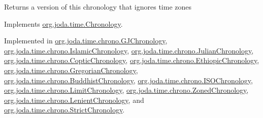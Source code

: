 \begin{DoxyReturn}{Returns}
a version of this chronology that ignores time zones 
\end{DoxyReturn}


Implements \hyperlink{classorg_1_1joda_1_1time_1_1_chronology_ab766a75c1e8d6daf119dc313088d9d53}{org.\-joda.\-time.\-Chronology}.



Implemented in \hyperlink{classorg_1_1joda_1_1time_1_1chrono_1_1_g_j_chronology_a76716c09d1606944ca70c1caeb07d7d9}{org.\-joda.\-time.\-chrono.\-G\-J\-Chronology}, \hyperlink{classorg_1_1joda_1_1time_1_1chrono_1_1_islamic_chronology_ac6349212d65c919a98bf09f4cb2007f0}{org.\-joda.\-time.\-chrono.\-Islamic\-Chronology}, \hyperlink{classorg_1_1joda_1_1time_1_1chrono_1_1_julian_chronology_a30554cff54dffeed275a4c6c85a652dd}{org.\-joda.\-time.\-chrono.\-Julian\-Chronology}, \hyperlink{classorg_1_1joda_1_1time_1_1chrono_1_1_coptic_chronology_a7b23ee9b458cd5a20c801eb48f7d8b1e}{org.\-joda.\-time.\-chrono.\-Coptic\-Chronology}, \hyperlink{classorg_1_1joda_1_1time_1_1chrono_1_1_ethiopic_chronology_aac9b3588161aa267d650cd74c27cebbb}{org.\-joda.\-time.\-chrono.\-Ethiopic\-Chronology}, \hyperlink{classorg_1_1joda_1_1time_1_1chrono_1_1_gregorian_chronology_a2efd6649353e4b99d85b4c091dcf3915}{org.\-joda.\-time.\-chrono.\-Gregorian\-Chronology}, \hyperlink{classorg_1_1joda_1_1time_1_1chrono_1_1_buddhist_chronology_a58019cde9420f095239425713f9497c4}{org.\-joda.\-time.\-chrono.\-Buddhist\-Chronology}, \hyperlink{classorg_1_1joda_1_1time_1_1chrono_1_1_i_s_o_chronology_a0688f24aa875e752c6140404d36c9423}{org.\-joda.\-time.\-chrono.\-I\-S\-O\-Chronology}, \hyperlink{classorg_1_1joda_1_1time_1_1chrono_1_1_limit_chronology_a00f3af557e93d287883f7816097c9aff}{org.\-joda.\-time.\-chrono.\-Limit\-Chronology}, \hyperlink{classorg_1_1joda_1_1time_1_1chrono_1_1_zoned_chronology_af4c31d7f1dc797e95024bfd480cf2af9}{org.\-joda.\-time.\-chrono.\-Zoned\-Chronology}, \hyperlink{classorg_1_1joda_1_1time_1_1chrono_1_1_lenient_chronology_aba4e10c57b7af6d29f44a432b0c737ec}{org.\-joda.\-time.\-chrono.\-Lenient\-Chronology}, and \hyperlink{classorg_1_1joda_1_1time_1_1chrono_1_1_strict_chronology_a9d34bea65c16f0dc53c82a0e3e582a3b}{org.\-joda.\-time.\-chrono.\-Strict\-Chronology}.

